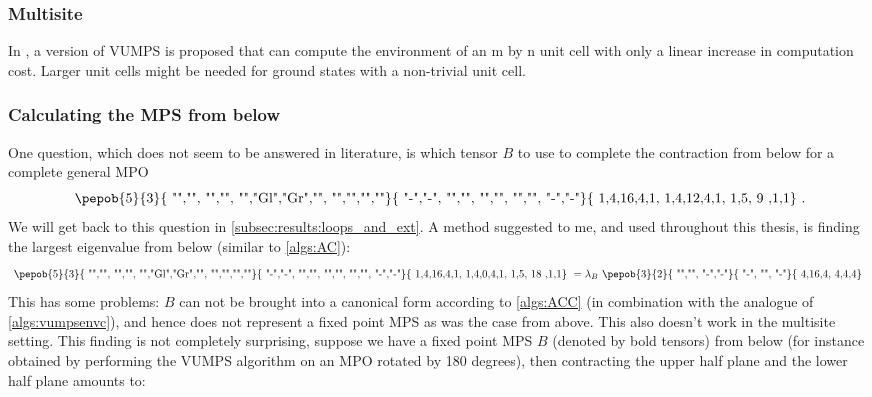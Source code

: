 \subsubsection{Multisite}
In \cite{Nietner2020}, a version of \Gls{VUMPS} is proposed that can compute the environment of an m by n unit cell with only a linear increase in computation cost. Larger unit cells might be needed for ground states with a non-trivial unit cell.

\subsubsection{Calculating the MPS from below}\label{subsec:vumps_below_alt}

One question, which does not seem to be answered in literature, is which tensor $B$ to use to complete the contraction from below for a complete general \Gls{MPO}
\begin{equation}
    \vcenter{ \hbox{   \pepob{5}{3}{{
                        "","", "","",
                        "","Gl","Gr","",
                        "","","",""}}{{
                        "-","-",
                        "","",
                        "","",
                        "","",
                        "-","-"}}{{
                        1,4,16,4,1,
                        1,4,12,4,1,
                        1,5, 9  ,1,1}} }} .
\end{equation}
We will get back to this question in \cref{subsec:results:loops_and_ext}. A method suggested to me, and used throughout this thesis, is finding the largest eigenvalue from below (similar to \cref{algs:AC}):
\begin{equation}
    \vcenter{ \hbox{   \pepob{5}{3}{{
                        "","", "","",
                        "","Gl","Gr","",
                        "","","",""}}{{
                        "-","-",
                        "","",
                        "","",
                        "","",
                        "-","-"}}{{
                        1,4,16,4,1,
                        1,4,0,4,1,
                        1,5, 18  ,1,1}} }}  = \lambda_B   \vcenter{ \hbox{  \pepob{3}{2}{{
                        "","",
                        "-","-"}}{{
                        "-",
                        "",
                        "-"}}{{
                        4,16,4,
                        4,4,4}} }}
\end{equation}
This has some problems: $B$ can not be brought into a canonical form according to \cref{algs:ACC} (in combination with the analogue of \cref{algs:vumpsenvc}), and hence does not represent a fixed point \Gls{MPS} as was the case from above. This also doesn't work in the multisite setting. This finding is not completely surprising, suppose we have a fixed point \Gls{MPS} $B$ (denoted by bold tensors) from below (for instance obtained by performing the \Gls{VUMPS} algorithm on an \Gls{MPO} rotated by 180 degrees), then contracting the upper half plane and the lower half plane amounts to:

